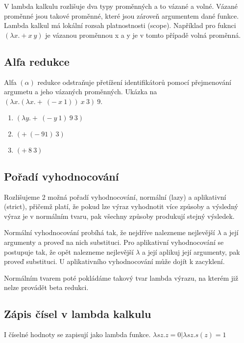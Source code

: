 \documentclass{szzclass}
\begin{document}
V lambda kalkulu rozlišuje dva typy proměnných a to vázané a volné. Vázané proměnné jsou takové proměnné, které jsou zároveň argumentem
dané funkce. Lambda kalkul má lokální rozsah platnostnosti (scope).
Například pro fuknci $(\lambda x . + x\ y)$ je vázanou proměnnou x a y je v tomto případě volná proměnná.

\subsection{Alfa redukce}

Alfa $(\alpha)$ redukce odstraňuje přetížení identifikátorů pomocí přejmenování argumetu a jeho vázaných proměnných.
Ukázka na $(\lambda x . (\lambda x . +\ (-\ x\ 1))\ x\ 3)\ 9$.
\begin{enumerate}
    \item $(\lambda y . +\ (-\ y\ 1)\ 9\ 3)$
    \item $(+\ (-\ 9 1)\ 3)$
    \item $(+\ 8\ 3)$
\end{enumerate}

\subsection{Pořadí vyhodnocování}

Rozlišujeme 2 možná pořadí vyhodnocování, normální (lazy) a aplikativní (strict), přičemž platí, že pokud lze výraz
vyhodnotit více způsoby a výsledný výraz je v normálním tvaru, pak všechny způsoby produkují stejný výsledek.

Normální vyhodnocování probíhá tak, že nejdříve nalezneme nejlevější $\lambda$ a její argumenty a proveď na nich substituci.
Pro aplikativní vyhodnocování se postupuje tak, že opět nalezneme nejlevější $\lambda$ a její aplikuj její argumenty, pak proveď substituci.
U aplikativního vyhodnocování může dojít k zacyklení.

Normálním tvarem poté pokládáme takový tvar lambda výrazu, na kterém již nelze provádět beta redukci.

\subsection{Zápis čísel v lambda kalkulu}

I číselné hodnoty se zapisují jako lambda funkce. $\lambda sz.z = 0 | \lambda sz. s(z) = 1$
\end{document}
